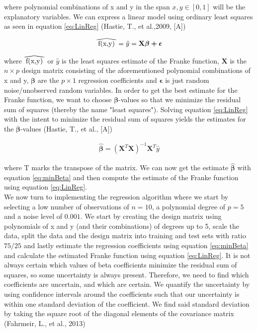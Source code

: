 \documentclass[12pt,a4paper]{article}
\newcommand\reallywidehat[1]{%
\savestack{\tmpbox}{\stretchto{%
  \scaleto{%
    \scalerel*[\widthof{\ensuremath{#1}}]{\kern-.6pt\bigwedge\kern-.6pt}%
    {\rule[-\textheight/2]{1ex}{\textheight}}%
  }{\textheight}%
}{0.5ex}}%
\stackon[1pt]{#1}{\tmpbox}%
}
\begin{document}
\noindent where polynomial combinations of x and y in the span $x,y \in [0,1]$ will be the explanatory variables. We can express a linear model using ordinary least squares as seen in equation \ref{eq:LinReg} (Hastie, T., et al.,2009, [A])

\begin{equation}\label{eq:LinReg}
\begin{aligned}
\reallywidehat{f(x,y)} = \hat{y} = \textbf{X} \boldsymbol{\beta + \epsilon}
\end{aligned}
\end{equation}

\noindent where $\reallywidehat{f(x,y)}$ or $\hat{y}$ is the least squares estimate of the Franke function, $\textbf{X}$ is the $n\times p$ design matrix consisting of the aforementioned polynomial combinations of x and y, $\boldsymbol{\beta}$ are the $p\times 1$ regression coefficients and $\boldsymbol{\epsilon}$ is just random noise/unobserved random variables. In order to get the best estimate for the Franke function, we want to choose $\boldsymbol{\beta}$-values so that we minimize the residual sum of squares (thereby the name "least squares"). Solving equation \ref{eq:LinReg} with the intent to minimize the residual sum of squares yields the estimates for the $\boldsymbol{\beta}$-values (Hastie, T., et al., [A])

\begin{equation}\label{eq:minBeta}
\begin{aligned}
\hat{\boldsymbol{\beta}} = (\textbf{X}^T\textbf{X})^{-1}\textbf{X}^T \hat{y}
\end{aligned}
\end{equation}

\noindent where T marks the transpose of the matrix. We can now get the estimate $\hat{\boldsymbol{\beta}}$ with equation \ref{eq:minBeta} and then compute the estimate of the Franke function using equation \ref{eq:LinReg}.
\\
We now turn to implementing the regression algorithm where we start by selecting a low number of observations of $n = 10$, a polynomial degree of $p = 5$ and a noise level of $0.001$. We start by creating the design matrix using polynomials of x and y (and their combinations) of degrees up to 5, scale the data, split the data and the design matrix into training and test sets with ratio $75/25$ and lastly estimate the regression coefficients using equation \ref{eq:minBeta} and calculate the estimated Franke function using equation \ref{eq:LinReg}. It is not always certain which values of beta coefficients minimize the residual sum of squares, so some uncertainty is always present. Therefore, we need to find which coefficients are uncertain, and which are certain. We quantify the uncertainty by using confidence intervals around the coefficients such that our uncertainty is within one standard deviation of the coefficient. We find said standard deviation by taking the square root of the diagonal elements of the covariance matrix (Fahrmeir, L., et al., 2013)
\end{document}
